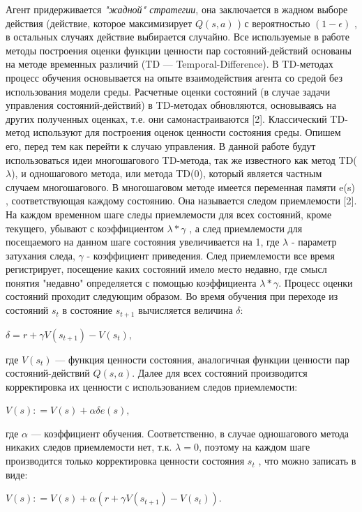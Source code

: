 \documentclass[12pt, a4paper]{report}
\theoremstyle{definition}
\theoremstyle{plain}
\theoremstyle{remark}
\theoremstyle{remark}
\theoremstyle{definition}
\begin{document}
Агент придерживается \textit{"жадной" стратегии}, она заключается в жадном выборе действия (действие, которое максимизирует $ Q(s, a) $ ) с вероятностью $ (1 - \epsilon) $ , в остальных случаях действие выбирается случайно. Все используемые в работе методы построения оценки функции ценности пар состояний-действий основаны на методе временных различий (TD — Temporal-Difference). В TD-методах процесс обучения основывается на опыте взаимодействия агента со средой без использования модели среды. Расчетные оценки состояний (в случае задачи управления состояний-действий) в TD-методах обновляются, основываясь на других полученных оценках, т.е. они самонастраиваются [2]. Классический TD-метод используют для построения оценок ценности состояния среды. Опишем его, перед тем как перейти к случаю управления. В данной работе будут использоваться идеи многошагового TD-метода, так же известного как метод TD( $\lambda $), и одношагового метода, или метода TD(0), который является частным случаем многошагового. В многошаговом методе имеется переменная памяти e(s) , соответствующая каждому состоянию. Она называется следом приемлемости [2]. На каждом временном шаге следы приемлемости для всех состояний, кроме текущего, убывают с коэффициентом $ \lambda * \gamma $ , а след приемлемости для посещаемого на данном шаге состояния увеличивается на 1, где $\lambda $ - параметр затухания следа, $\gamma $ - коэффициент приведения. След приемлемости все время регистрирует, посещение каких состояний имело место недавно, где смысл понятия "недавно" определяется с помощью коэффициента $ \lambda *\gamma $. Процесс оценки состояний проходит следующим образом. Во время обучения при переходе из состояний $s_{t}$ в состояние $s_{t+1}$ вычисляется величина $\delta$:
\begin{center}
	$ \delta = r + \gamma V(s_{t+1}) - V(s_{t}),$
\end{center}

где $ V(s_{t}) $ — функция ценности состояния, аналогичная функции ценности пар состояний-действий $ Q(s, a)  $. Далее для всех состояний производится корректировка их ценности с использованием следов приемлемости:
\begin{center}
	$  V(s): = V(s) + \alpha\delta e(s),$
\end{center}
где $\alpha$ — коэффициент обучения. Соответственно, в случае одношагового метода никаких следов приемлемости нет, т.к. $\lambda = 0 $, поэтому на каждом шаге
производится только корректировка ценности состояния $s_{t}$ , что можно записать в виде:
\begin{center}
	$ V(s): = V(s) + \alpha(r + \gamma V(s_{t+1}) - V(s_{t})). $
\end{center}
\end{document}
